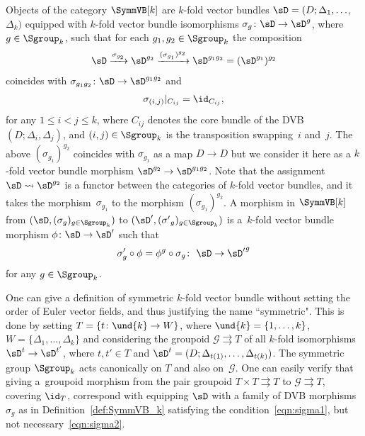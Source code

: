 \begin{Definition}\label{def:SymmVB_k} Objects of the category $\SymmVB[k]$ are $k$-fold vector bundles $\sD = (D; \Delta_1, \ldots$, $\Delta_k)$ equipped with $k$-fold vector bundle isomorphisms $\sigma_g\colon \sD\rightarrow \sD^g$, where $g\in \Sgroup_k$, such that for each $g_1, g_2\in \Sgroup_k$ the composition
\begin{gather}\label{eqn:sigma1}
\sD \xrightarrow{\sigma_{g_2}} \sD^{g_2} \xrightarrow{(\sigma_{g_1})^{g_2}} \sD^{g_1g_2} = (\sD^{g_1})^{g_2}
\end{gather}
coincides with $\sigma_{g_1g_2}\colon \sD\rightarrow \sD^{g_1g_2}$ and
\begin{gather}\label{eqn:sigma2}
\sigma_{(i,j)}|_{C_{ij}} = \id_{C_{ij}},
\end{gather}
for any $1\leq i<j\leq k $, where $C_{ij}$ denotes the core bundle of the DVB $(D; \Delta_i, \Delta_j)$, and $(i,j)\in \Sgroup_k$ is the transposition swapping~$i$ and~$j$. The above $(\sigma_{g_1})^{g_2}$ coincides with $\sigma_{g_1}$ as a map $D\rightarrow D$ but we consider it here as a $k$-fold vector bundle morphism $\sD^{g_2} \rightarrow \sD^{g_1g_2}$. Note that the assignment $\sD \rightsquigarrow \sD^{g_2}$ is a functor between the categories of $k$-fold vector bundles, and it takes the mor\-phism~$\sigma_{g_1}$ to the morphism $(\sigma_{g_1})^{g_2}$. A morphism in $\SymmVB[k]$ from $(\sD, (\sigma_g)_{g\in \Sgroup_k})$ to $(\sD', ({\sigma'}_g)_{g\in \Sgroup_k})$ is a~$k$-fold vector bundle morphism $\phi\colon \sD\rightarrow \sD'$ such that
\begin{gather}\label{eqn:morphisms_in_C_k}
\sigma'_g \circ \phi = \phi^g \circ \sigma_g\colon \ \sD\rightarrow {\sD'}^g
\end{gather}
for any $g\in \Sgroup_k$.
\end{Definition}

\begin{Remark} One can give a def\/inition of symmetric $k$-fold vector bundle without setting the order of Euler vector f\/ields, and thus justifying the name ``symmetric". This is done by setting $T = \{t\colon \und{k}\to W\}$, where $\und{k}=\{1, \ldots, k\}$, $W=\{\Delta_1, \ldots, \Delta_k\}$ and considering the groupoid $\mathcal{G}\rightrightarrows T$ of all $k$-fold isomorphisms $\sD^t \to \sD^{t'}$, where $t, t'\in T$ and $\sD^t = (D; \Delta_{t(1)}, \ldots, \Delta_{t(k)})$. The symmetric group $\Sgroup_k$ acts canonically on $T$ and also on~$\mathcal{G}$. One can easily verify that giving a~groupoid morphism from the pair groupoid $T\times T\rightrightarrows T$ to $\mathcal{G}\rightrightarrows T$, covering $\id_T$, correspond with equipping $\sD$ with a family of DVB morphisms $\sigma_g$ as in Def\/inition~\ref{def:SymmVB_k} satisfying the condition~\eqref{eqn:sigma1}, but not necessary~\eqref{eqn:sigma2}.
\end{Remark}

